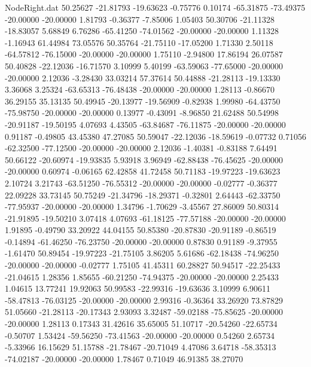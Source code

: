 \begin{filecontents}{NodeRight.dat}
  50.25627  -21.81793  -19.63623    -0.75776    0.10174  -65.31875  -73.49375  -20.00000  -20.00000    1.81793   -0.36377   -7.85006    1.05403
  50.30706  -21.11328  -18.83057     5.68849    6.76286  -65.41250  -74.01562  -20.00000  -20.00000    1.11328   -1.16943   61.44984   73.05576
  50.35764  -21.75110  -17.05200     1.71330    2.50118  -64.57812  -76.15000  -20.00000  -20.00000    1.75110   -2.94800   17.86194   26.07587
  50.40828  -22.12036  -16.71570     3.10999    5.40199  -63.59063  -77.65000  -20.00000  -20.00000    2.12036   -3.28430   33.03214   57.37614
  50.44888  -21.28113  -19.13330     3.36068    3.25324  -63.65313  -76.48438  -20.00000  -20.00000    1.28113   -0.86670   36.29155   35.13135
  50.49945  -20.13977  -19.56909    -0.82938    1.99980  -64.43750  -75.98750  -20.00000  -20.00000    0.13977   -0.43091   -8.96850   21.62488
  50.54998  -20.91187  -19.50195     4.07693    4.43505  -63.84687  -76.11875  -20.00000  -20.00000    0.91187   -0.49805   43.45380   47.27085
  50.59047  -22.12036  -18.59619    -0.07732    0.71056  -62.32500  -77.12500  -20.00000  -20.00000    2.12036   -1.40381   -0.83188    7.64491
  50.66122  -20.60974  -19.93835     5.93918    3.96949  -62.88438  -76.45625  -20.00000  -20.00000    0.60974   -0.06165   62.42858   41.72458
  50.71183  -19.97223  -19.63623     2.10724    3.21743  -63.51250  -76.55312  -20.00000  -20.00000   -0.02777   -0.36377   22.09228   33.73145
  50.75249  -21.34796  -18.29371    -0.32801    2.64443  -62.33750  -77.95937  -20.00000  -20.00000    1.34796   -1.70629   -3.45567   27.86009
  50.80314  -21.91895  -19.50210     3.07418    4.07693  -61.18125  -77.57188  -20.00000  -20.00000    1.91895   -0.49790   33.20922   44.04155
  50.85380  -20.87830  -20.91189    -0.86519   -0.14894  -61.46250  -76.23750  -20.00000  -20.00000    0.87830    0.91189   -9.37955   -1.61470
  50.89454  -19.97223  -21.75105     3.86205    5.61686  -62.18438  -74.96250  -20.00000  -20.00000   -0.02777    1.75105   41.45311   60.28827
  50.94517  -22.25433  -21.04615     1.28356    1.85655  -60.21250  -74.94375  -20.00000  -20.00000    2.25433    1.04615   13.77241   19.92063
  50.99583  -22.99316  -19.63636     3.10999    6.90611  -58.47813  -76.03125  -20.00000  -20.00000    2.99316   -0.36364   33.26920   73.87829
  51.05660  -21.28113  -20.17343     2.93093    3.32487  -59.02188  -75.85625  -20.00000  -20.00000    1.28113    0.17343   31.42616   35.65005
  51.10717  -20.54260  -22.65734    -0.50707    1.53424  -59.56250  -73.41563  -20.00000  -20.00000    0.54260    2.65734   -5.33966   16.15629
  51.15788  -21.78467  -20.71049     4.47086    3.64718  -58.35313  -74.02187  -20.00000  -20.00000    1.78467    0.71049   46.91385   38.27070

\end{filecontents}
